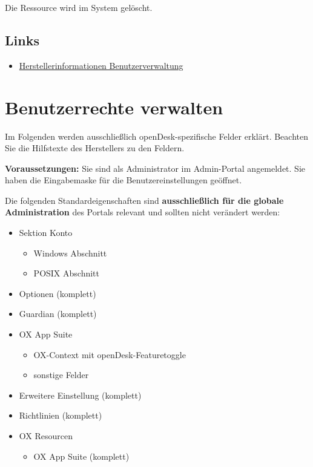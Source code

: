 \documentclass[
  letterpaper,
  DIV=11,
  numbers=noendperiod]{scrreprt}
\providecommand{\tightlist}{%
  \setlength{\itemsep}{0pt}\setlength{\parskip}{0pt}}\usepackage{longtable,booktabs,array}
\begin{document}
Die Ressource wird im System gelöscht.

\section{Links}\label{links}

\begin{itemize}
\tightlist
\item
  \href{https://docs.software-univention.de/manual/5.0/de/user-management/index.html}{Herstellerinformationen
  Benutzerverwaltung}
\end{itemize}

\chapter{Benutzerrechte verwalten}\label{benutzerrechte-verwalten}

Im Folgenden werden ausschließlich openDesk-spezifische Felder erklärt.
Beachten Sie die Hilfstexte des Herstellers zu den Feldern.

\textbf{Voraussetzungen:} Sie sind als Administrator im Admin-Portal
angemeldet. Sie haben die Eingabemaske für die Benutzereinstellungen
geöffnet.

Die folgenden Standardeigenschaften sind \textbf{ausschließlich für die
globale Administration} des Portals relevant und sollten nicht verändert
werden:

\begin{itemize}
\tightlist
\item
  Sektion Konto

  \begin{itemize}
  \tightlist
  \item
    Windows Abschnitt
  \item
    POSIX Abschnitt
  \end{itemize}
\item
  Optionen (komplett)
\item
  Guardian (komplett)
\item
  OX App Suite

  \begin{itemize}
  \tightlist
  \item
    OX-Context mit openDesk-Featuretoggle
  \item
    sonstige Felder
  \end{itemize}
\item
  Erweitere Einstellung (komplett)
\item
  Richtlinien (komplett)
\item
  OX Resourcen

  \begin{itemize}
  \tightlist
  \item
    OX App Suite (komplett)
  \end{itemize}
\end{itemize}
\end{document}
